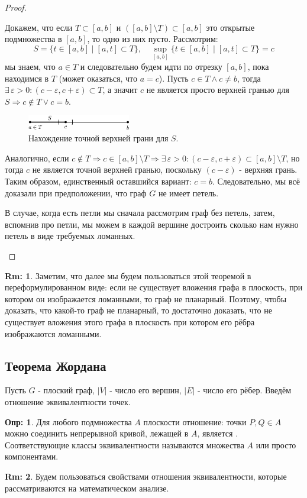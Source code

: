 \documentclass[12pt]{article}
\newcommand{\VE}{\varepsilon}
\theoremstyle{definition}
\newtheorem{defn}{Опр:}
\newtheorem{rem}{Rm:}
\begin{document}
\begin{proof}
\begin{enumerate}[label ={\arabic*)}]
		Докажем, что если $T \subset [a,b]$ и $([a,b]\setminus T) \subset [a,b]$ это открытые подмножества в $[a,b]$, то одно из них пусто. Рассмотрим:
		$$
			S = \{t \in [a,b] \mid [a,t] \subset T\}, \quad \sup\limits_{[a,b]}\{t \in [a,b] \mid [a,t] \subset T\} = c
		$$ 
		мы знаем, что $a \in T$ и следовательно будем идти по отрезку $[a,b]$, пока находимся в $T$ (может оказаться, что $a = c$). Пусть $c \in T \wedge c \neq b$, тогда $\exists \, \VE > 0 \colon (c - \VE, c+ \VE) \subset T$, а значит $c$ не является просто верхней гранью для $S \Rightarrow c \not\in T \vee c = b$.
		\begin{figure}[H]
			\centering
			\includegraphics[width=0.4\textwidth]{GATL2_10.eps}
			\caption{Нахождение точной верхней грани для $S$.}
			\label{2_10}
		\end{figure}
		 Аналогично, если $c \not\in T \Rightarrow c \in [a,b]\setminus T \Rightarrow \exists \, \VE > 0 \colon (c - \VE, c + \VE) \subset [a,b]\setminus T$, но тогда $c$ не является точной верхней гранью, поскольку $(c - \VE)$ - верхняя грань. Таким образом, единственный оставшийся вариант: $c = b$. Следовательно, мы всё доказали при предположении, что граф $G$ не имеет петель. 
		 
		 В случае, когда есть петли мы сначала рассмотрим граф без петель, затем, вспомнив про петли, мы можем в каждой вершине достроить сколько нам нужно петель в виде требуемых ломанных.
	\end{enumerate}
\end{proof}
\newpage

\begin{rem}
	Заметим, что далее мы будем пользоваться этой теоремой в переформулированном виде: если не существует вложения графа в плоскость, при котором он изображается ломанными, то граф не планарный. Поэтому, чтобы доказать, что какой-то граф не планарный, то достаточно доказать, что не существует вложения этого графа в плоскость при котором его рёбра изображаются ломанными.
\end{rem}

\subsection*{Теорема Жордана}
Пусть $G$ - плоский граф, $|V|$ - число его вершин, $|E|$ -  число его рёбер. Введём отношение эквивалентности точек. 
\begin{defn}
	Для любого подмножества $A$ плоскости отношение: точки $P,Q \in A$ можно соединить непрерывной кривой, лежащей в $A$, является . Соответствующие классы эквивалентности называются  множества $A$ или просто компонентами.
\end{defn}
\begin{rem}
	Будем пользоваться свойствами отношения эквивалентности, которые рассматриваются на математическом анализе.
\end{rem}
\end{document}
